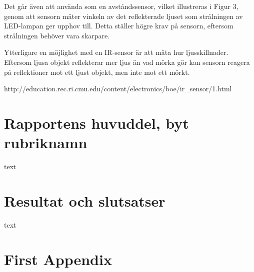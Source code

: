 \documentclass[11pt]{article}
\begin{document}
\begin{flushleft}
Det går även att använda som en avståndssensor, vilket illustreras i Figur 3, genom att sensorn mäter vinkeln av det reflekterade ljuset som strålningen av LED-lampan ger upphov till. Detta ställer högre krav på sensorn, eftersom strålningen behöver vara skarpare.

Ytterligare en möjlighet med en IR-sensor är att mäta hur ljusskillnader. Eftersom ljusa objekt reflekterar mer ljus än vad mörka gör kan sensorn reagera på reflektioner mot ett ljust objekt, men inte mot ett mörkt. 

http://education.rec.ri.cmu.edu/content/electronics/boe/ir_sensor/1.html


\pagebreak
\section{Rapportens huvuddel, byt rubriknamn}
text

\section{Resultat och slutsatser}
text

\pagebreak
{}



\pagebreak
\appendix
\section{First Appendix}

\end{flushleft}
\end{document}
